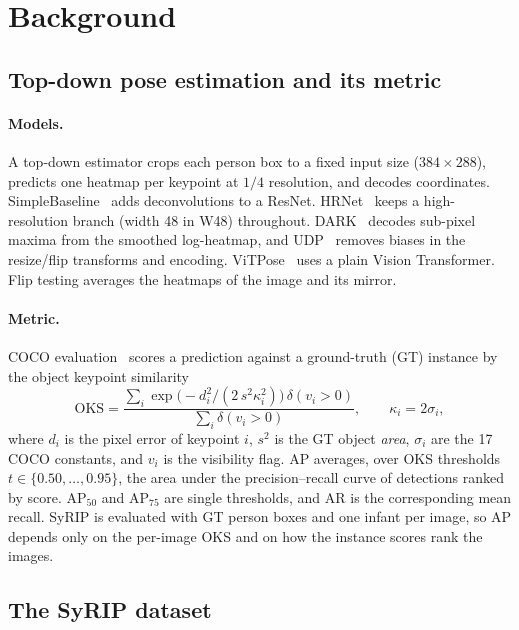 \section{Background}\label{sec:background}

\subsection{Top-down pose estimation and its metric}\label{sec:metric}

\paragraph{Models.} A top-down estimator crops each person box to a fixed input size (\eg $384{\times}288$), predicts one heatmap per keypoint at $1/4$ resolution, and decodes coordinates.
SimpleBaseline~\citep{xiao2018simple} adds deconvolutions to a ResNet. HRNet~\citep{sun2019hrnet} keeps a high-resolution branch (width 48 in W48) throughout. DARK~\citep{zhang2020darkpose} decodes sub-pixel maxima from the smoothed log-heatmap, and UDP~\citep{huang2020udp} removes biases in the resize/flip transforms and encoding. ViTPose~\citep{xu2022vitpose} uses a plain Vision Transformer.
Flip testing averages the heatmaps of the image and its mirror.

\paragraph{Metric.} COCO evaluation~\citep{lin2014coco,cocoapi} scores a prediction against a ground-truth (GT) instance by the object keypoint similarity
\begin{equation}
  \mathrm{OKS}=\frac{\sum_i \exp\!\big(-d_i^2/(2\,s^2\kappa_i^2)\big)\,\delta(v_i>0)}{\sum_i \delta(v_i>0)},\qquad \kappa_i=2\sigma_i ,
  \label{eq:oks}
\end{equation}
where $d_i$ is the pixel error of keypoint $i$, $s^2$ is the GT object \emph{area}, $\sigma_i$ are the 17 COCO constants, and $v_i$ is the visibility flag.
AP averages, over OKS thresholds $t\in\{0.50,\dots,0.95\}$, the area under the precision--recall curve of detections ranked by score. AP$_{50}$ and AP$_{75}$ are single thresholds, and AR is the corresponding mean recall.
SyRIP is evaluated with GT person boxes and one infant per image, so AP depends only on the per-image OKS and on how the instance scores rank the images.

\subsection{The SyRIP dataset}\label{sec:syrip}

